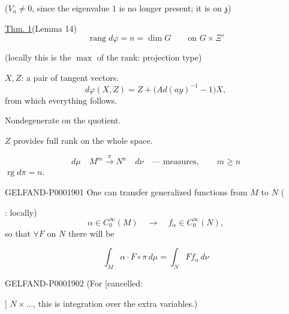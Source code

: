 ($V_a\ne0$, since the eigenvalue $1$ is no longer present; it is on $\mathfrak z$)



\underline{Thm. 1}\quad (Lemma 14)
\begin{equation*}
\operatorname{rang}d\varphi=n=\dim G\qquad\text{on }G\times\Xi'
\end{equation*}



(locally this is the $\max$ of the rank: projection type)



 $X, Z$: a pair of tangent vectors.
\begin{equation*}
d\varphi (X, Z)=Z+\bigl (Ad (ay)^{-1}-1\bigr)X,
\end{equation*}
from which everything follows.



Nondegenerate on the quotient.

$Z$ provides full rank on the whole space.



\begin{equation*}
d\mu\quad M^m\overset{\pi}{\longrightarrow}N^n\quad d\nu
\quad\text{— measures},\qquad m\ge n
\end{equation*}
$\operatorname{rg}d\pi=n$.



\begin{GelfandAdjacentEvidence}{GELFAND-P000190}{1}
One can transfer generalized functions from $M$ to $N$
(
\end{GelfandAdjacentEvidence}
: locally)
\begin{equation*}
\alpha\in C_0^\infty (M)\quad\longrightarrow\quad f_\alpha\in C_0^\infty (N),
\end{equation*}
so that $\forall F$ on $N$ there will be



\begin{equation*}
\int_M\alpha\cdot F\circ\pi\, d\mu=\int_N Ff_\alpha\, d\nu
\end{equation*}



\begin{GelfandAdjacentEvidence}{GELFAND-P000190}{2}
(For [cancelled: 
\end{GelfandAdjacentEvidence}
]
$N\times\ldots$, this is integration over the extra variables.)

